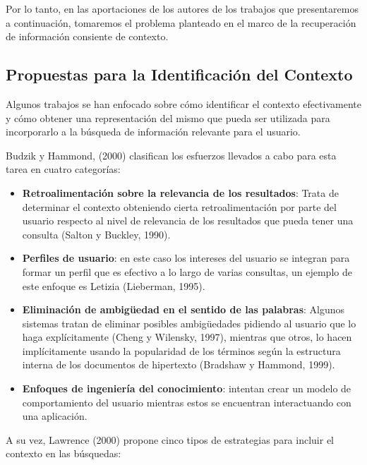 Por lo tanto, en las aportaciones de los autores de los trabajos que
presentaremos a
continuación, tomaremos el problema planteado en el marco de la recuperación de
información consiente de contexto.

\subsection {Propuestas para la Identificación del Contexto} 

Algunos trabajos se han enfocado sobre cómo identificar el contexto
efectivamente y
cómo obtener una representación del mismo que pueda ser utilizada para
incorporarlo a
la búsqueda de información relevante para el usuario.

Budzik y Hammond, (2000) clasifican los esfuerzos llevados a cabo para esta
tarea en cuatro categorías:

\begin{itemize}
\item \textbf{Retroalimentación sobre la relevancia de los resultados}: Trata
de determinar el contexto obteniendo cierta retroalimentación por parte del
usuario respecto al nivel
de relevancia de los resultados que pueda tener una consulta (Salton y
Buckley, 1990).


\item \textbf{Perfiles de usuario}: en este caso los intereses del usuario se
integran para formar un
perfil que es efectivo a lo largo de varias consultas, un ejemplo de este
enfoque es
Letizia (Lieberman, 1995).

\item \textbf{Eliminación de ambigüedad en el sentido de las palabras}: Algunos
sistemas tratan
de eliminar posibles ambigüedades pidiendo al usuario que lo haga explícitamente
(Cheng y Wilensky, 1997), mientras que otros, lo hacen implícitamente usando la
popularidad de los términos según la estructura interna de los documentos de
hipertexto (Bradshaw y Hammond, 1999).

\item \textbf{Enfoques de ingeniería del conocimiento}: intentan crear un modelo
de
comportamiento del usuario mientras estos se encuentran interactuando con una
aplicación.
\end{itemize}

A su vez, Lawrence (2000) propone cinco tipos de estrategias para incluir el
contexto en
las búsquedas:

